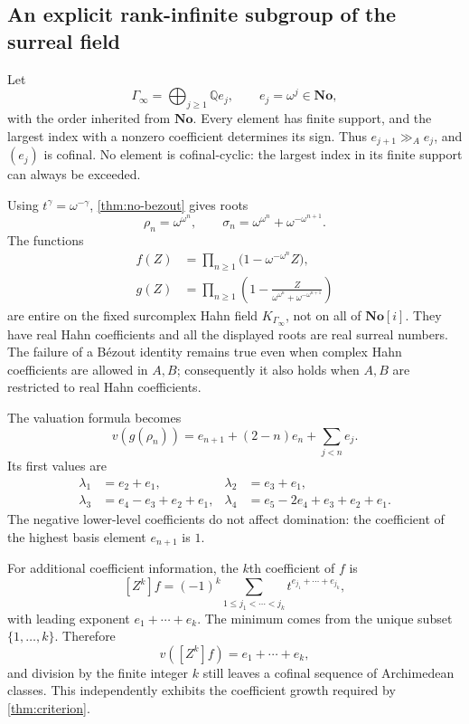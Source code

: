 \documentclass[11pt]{article}
\theoremstyle{plain}
\theoremstyle{plain}
\theoremstyle{plain}
\theoremstyle{definition}
\theoremstyle{definition}
\theoremstyle{definition}
\theoremstyle{remark}
\newcommand{\Q}{\mathbb Q}\newcommand{\Z}{\mathbb Z}\newcommand{\N}{\mathbb N}
\newcommand{\No}{\mathbf{No}}
\newcommand{\ggA}{\mathrel{\gg_{\!A}}}
\begin{document}
\subsection{An explicit rank-infinite subgroup of the surreal field}
Let
\begin{equation}\label{eq:concrete-group}
 \Gamma_\infty=\bigoplus_{j\ge1}\Q e_j,
 \qquad e_j=\omega^j\in\No,
\end{equation}
with the order inherited from $\No$. Every element has finite
support, and the largest index with a nonzero coefficient determines
its sign. Thus $e_{j+1}\ggA e_j$, and $(e_j)$ is cofinal. No element
is cofinal-cyclic: the largest index in its finite support can always
be exceeded.

Using $t^\gamma=\omega^{-\gamma}$, \cref{thm:no-bezout} gives roots
\begin{equation}\label{eq:surreal-roots}
 \rho_n=\omega^{\omega^n},\qquad
 \sigma_n=\omega^{\omega^n}+\omega^{-\omega^{n+1}}.
\end{equation}
The functions
\begin{align*}
 f(Z)&=\prod_{n\ge1}\bigl(1-\omega^{-\omega^n}Z\bigr),\\
 g(Z)&=\prod_{n\ge1}\left(
 1-\frac{Z}{\omega^{\omega^n}+\omega^{-\omega^{n+1}}}\right)
\end{align*}
are entire on the fixed surcomplex Hahn field $K_{\Gamma_\infty}$,
not on all of $\No[i]$. They have real Hahn coefficients and all the
displayed roots are real surreal numbers. The failure of a B\'ezout
identity remains true even when complex Hahn coefficients are allowed
in $A,B$; consequently it also holds when $A,B$ are restricted to
real Hahn coefficients.

The valuation formula becomes
\[
 v(g(\rho_n))=e_{n+1}+(2-n)e_n+\sum_{j<n}e_j.
\]
Its first values are
\begin{align*}
 \lambda_1&=e_2+e_1, & \lambda_2&=e_3+e_1,\\
 \lambda_3&=e_4-e_3+e_2+e_1,
 &\lambda_4&=e_5-2e_4+e_3+e_2+e_1.
\end{align*}
The negative lower-level coefficients do not affect domination:
the coefficient of the highest basis element $e_{n+1}$ is $1$.

For additional coefficient information, the $k$th coefficient of $f$
is
\[
 [Z^k]f=(-1)^k\sum_{1\le j_1<\cdots<j_k}
                         t^{e_{j_1}+\cdots+e_{j_k}},
\]
with leading exponent $e_1+\cdots+e_k$. The minimum comes from the
unique subset $\{1,\ldots,k\}$. Therefore
\[
 v([Z^k]f)=e_1+\cdots+e_k,
\]
and division by the finite integer $k$ still leaves a cofinal sequence
of Archimedean classes. This independently exhibits the coefficient
growth required by \cref{thm:criterion}.
\end{document}
